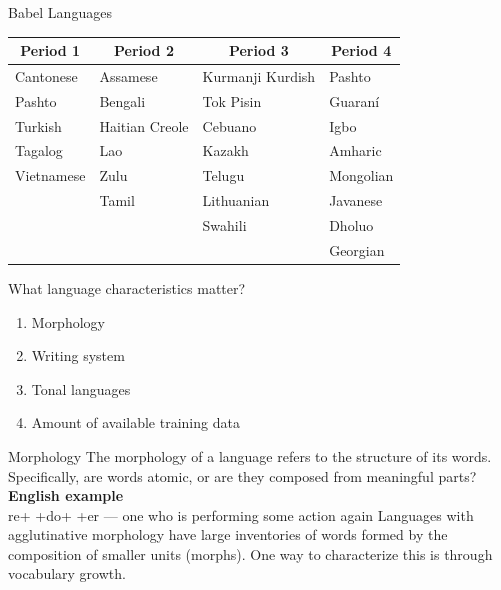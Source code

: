 \begin{frame}{Babel Languages}{}
  \begin{center}
    \begin{tabular}{@{}llll@{}} \toprule
      \multicolumn{1}{c}{\bf Period 1} & \multicolumn{1}{c}{\bf Period 2} & \multicolumn{1}{c}{\bf Period 3} & \multicolumn{1}{c}{\bf Period 4} \\ \midrule
      Cantonese  & Assamese       & Kurmanji Kurdish & Pashto \\
      Pashto     & Bengali        & Tok Pisin        & Guaran\'{i} \\
      Turkish    & Haitian Creole & Cebuano          & Igbo \\
      Tagalog    & Lao            & Kazakh           & Amharic \\
      Vietnamese & Zulu           & Telugu           & Mongolian \\
                 & Tamil          & Lithuanian       & Javanese \\
                 &                & Swahili          & Dholuo \\
                 &                &                  & Georgian \\ \bottomrule
    \end{tabular}
  \end{center}
\end{frame}

\begin{frame}{What language characteristics matter?}{}
  \begin{enumerate}
  \item Morphology
  \item Writing system
  \item Tonal languages
  \item Amount of available training data
  \end{enumerate}
\end{frame}

\begin{frame}{Morphology}{}
  The morphology of a language refers to the structure of its words.
  Specifically, are words atomic, or are they composed from meaningful
  parts?
  \vfill
  {\color{DarkerBlue}\bf English example} \\
  re+ +do+ +er --- one who is performing some action again
  \vfill
  Languages with \alert{agglutinative} morphology have large
  inventories of words formed by the composition of smaller units
  (morphs).
  \vfill
  One way to characterize this is through vocabulary growth.
\end{frame}


